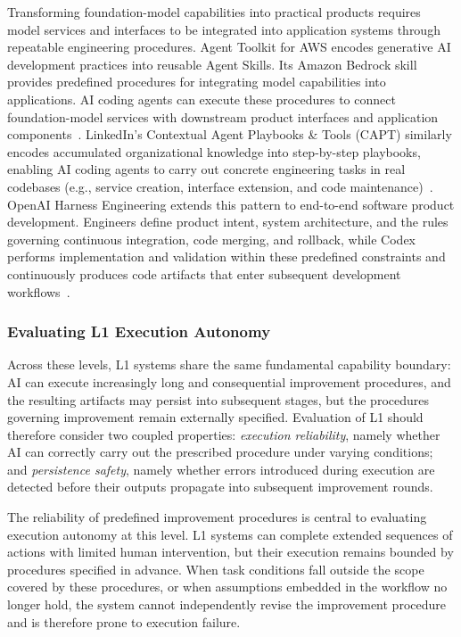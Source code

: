 Transforming foundation-model capabilities into practical products requires model services and interfaces to be integrated into application systems through repeatable engineering procedures. Agent Toolkit for AWS encodes generative AI development practices into reusable Agent Skills. Its Amazon Bedrock skill provides predefined procedures for integrating model capabilities into applications. AI coding agents can execute these procedures to connect foundation-model services with downstream product interfaces and application components~\cite{aws_agent_toolkit}. LinkedIn's Contextual Agent Playbooks \& Tools (CAPT) similarly encodes accumulated organizational knowledge into step-by-step playbooks, enabling AI coding agents to carry out concrete engineering tasks in real codebases (e.g., service creation, interface extension, and code maintenance)~\cite{linkedin_capt}. OpenAI Harness Engineering extends this pattern to end-to-end software product development. Engineers define product intent, system architecture, and the rules governing continuous integration, code merging, and rollback, while Codex performs implementation and validation within these predefined constraints and continuously produces code artifacts that enter subsequent development workflows~\cite{openai_harness_engineering}.

\subsubsection{Evaluating L1 Execution Autonomy}
Across these levels, L1 systems share the same fundamental capability boundary: AI can execute increasingly long and consequential improvement procedures, and the resulting artifacts may persist into subsequent stages, but the procedures governing improvement remain externally specified. Evaluation of L1 should therefore consider two coupled properties: \emph{execution reliability}, namely whether AI can correctly carry out the prescribed procedure under varying conditions; and \emph{persistence safety}, namely whether errors introduced during execution are detected before their outputs propagate into subsequent improvement rounds.

The reliability of predefined improvement procedures is central to evaluating execution autonomy at this level. L1 systems can complete extended sequences of actions with limited human intervention, but their execution remains bounded by procedures specified in advance. When task conditions fall outside the scope covered by these procedures, or when assumptions embedded in the workflow no longer hold, the system cannot independently revise the improvement procedure and is therefore prone to execution failure.

